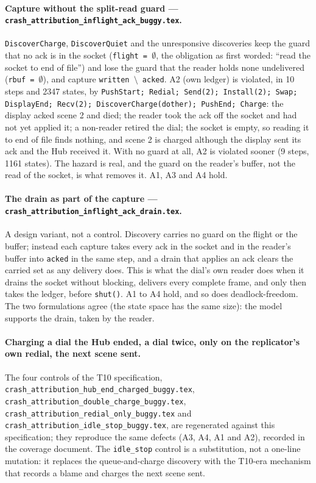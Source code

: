 \documentclass[a4paper,10pt,fleqn]{article}
\begin{document}
\paragraph{Capture without the split-read guard ---
\texttt{crash\_attribution\_inflight\_ack\_buggy.tex}.}
\texttt{DiscoverCharge}, \texttt{DiscoverQuiet} and the unresponsive discoveries
keep the guard that no ack is in the socket (\texttt{flight = $\emptyset$}, the
obligation as first worded: ``read the socket to end of file'') and lose the guard
that the reader holds none undelivered (\texttt{rbuf = $\emptyset$}), and capture
\texttt{written $\setminus$ acked}.  A2 (own ledger) is violated, in 10 steps and
2347 states, by \texttt{PushStart; Redial; Send(2); Install(2); Swap; DisplayEnd;
Recv(2); DiscoverCharge(dother); PushEnd; Charge}: the display acked scene 2 and
died; the reader took the ack off the socket and had not yet applied it; a
non-reader retired the dial; the socket is empty, so reading it to end of file
finds nothing, and scene 2 is charged although the display sent its ack and the
Hub received it.  With no guard at all, A2 is violated sooner (9 steps, 1161
states).  The hazard is real, and the guard on the reader's buffer, not the read
of the socket, is what removes it.  A1, A3 and A4 hold.

\paragraph{The drain as part of the capture ---
\texttt{crash\_attribution\_inflight\_ack\_drain.tex}.}
A design variant, not a control.  Discovery carries no guard on the flight or the
buffer; instead each capture takes every ack in the socket and in the reader's
buffer into \texttt{acked} in the same step, and a drain that applies an ack
clears the carried set as any delivery does.  This is what the dial's own reader
does when it drains the socket without blocking, delivers every complete frame,
and only then takes the ledger, before \texttt{shut()}.  A1 to A4 hold, and so
does deadlock-freedom.  The two formulations agree (the state space has the same
size): the model supports the drain, taken by the reader.

\paragraph{Charging a dial the Hub ended, a dial twice, only on the
replicator's own redial, the next scene sent.}
The four controls of the T10 specification, \texttt{crash\_attribution\_hub\_end\_charged\_buggy.tex},
\texttt{crash\_attribution\_double\_charge\_buggy.tex},
\texttt{crash\_attribution\_redial\_only\_buggy.tex} and
\texttt{crash\_attribution\_idle\_stop\_buggy.tex}, are regenerated against this
specification; they reproduce the same defects (A3, A4, A1 and A2), recorded in
the coverage document.  The
\texttt{idle\_stop} control is a substitution, not a one-line mutation: it
replaces the queue-and-charge discovery with the T10-era mechanism that records
a blame and charges the next scene sent.
\end{document}
